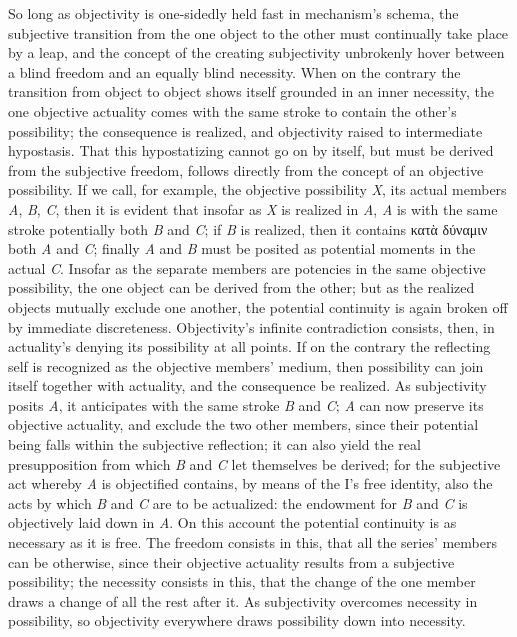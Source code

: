 \documentclass[12pt]{book}
\begin{document}
So long as objectivity is one-sidedly held fast in mechanism's schema, the
subjective transition from the one object to the other must continually take
place by a leap, and the concept of the creating subjectivity unbrokenly
hover between a blind freedom and an equally blind necessity. When on the
contrary the transition from object to object shows itself grounded in an
inner necessity, the one objective actuality comes with the same stroke to
contain the other's possibility; the consequence is realized, and
objectivity raised to intermediate hypostasis. That this hypostatizing
cannot go on by itself, but must be derived from the subjective freedom,
follows directly from the concept of an objective possibility. If we call,
for example, the objective possibility \textit{X}, its actual members
\textit{A}, \textit{B}, \textit{C}, then it is evident that insofar as
\textit{X} is realized in \textit{A}, \textit{A} is with the same stroke
potentially both \textit{B} and \textit{C}; if \textit{B} is realized, then
it contains κατὰ δύναμιν both \textit{A} and \textit{C}; finally \textit{A}
and \textit{B} must be posited as potential moments in the actual
\textit{C}. Insofar as the separate members are potencies in the same
objective possibility, the one object can be derived from the other; but as
the realized objects mutually exclude one another, the potential continuity
is again broken off by immediate discreteness. Objectivity's infinite
contradiction consists, then, in actuality's denying its possibility at all
points. If on the contrary the reflecting self is recognized as the
objective members' medium, then possibility can join itself together with
actuality, and the consequence be realized. As subjectivity posits
\textit{A}, it anticipates with the same stroke \textit{B} and \textit{C};
\textit{A} can now preserve its objective actuality, and exclude the two
other members, since their potential being falls within the subjective
reflection; it can also yield the real presupposition from which \textit{B}
and \textit{C} let themselves be derived; for the subjective act whereby
\textit{A} is objectified contains, by means of the I's free identity, also
the acts by which \textit{B} and \textit{C} are to be actualized: the
endowment for \textit{B} and \textit{C} is objectively laid down in
\textit{A}. On this account the potential continuity is as necessary as it
is free. The freedom consists in this, that all the series' members can be
otherwise, since their objective actuality results from a subjective
possibility; the necessity consists in this, that the change of the one
member draws a change of all the rest after it. As subjectivity overcomes
necessity in possibility, so objectivity everywhere draws possibility down
into necessity.
\end{document}
